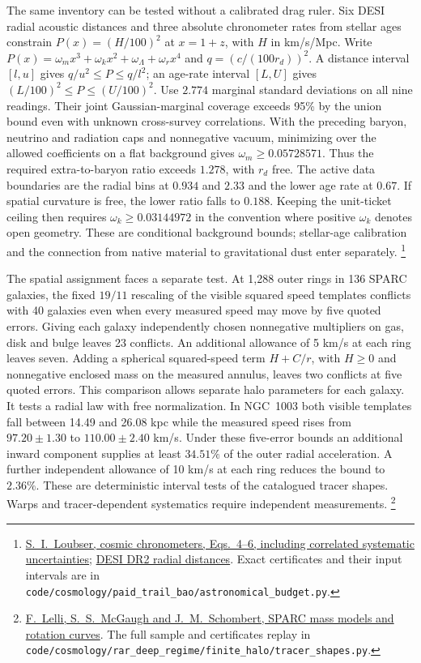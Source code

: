 \documentclass[11pt]{article}
\begin{document}
The same inventory can be tested without a calibrated drag ruler.
Six DESI radial acoustic distances and three absolute chronometer
rates from stellar ages constrain $P(x)=(H/100)^2$ at $x=1+z$,
with $H$ in km/s/Mpc. Write
$P(x)=\omega_m x^3+\omega_k x^2+\omega_\Lambda+\omega_r x^4$ and
$q=(c/(100r_d))^2$. A distance interval $[l,u]$ gives
$q/u^2\le P\le q/l^2$; an age-rate interval $[L,U]$ gives
$(L/100)^2\le P\le(U/100)^2$. Use $2.774$ marginal standard
deviations on all nine readings. Their joint Gaussian-marginal
coverage exceeds 95\% by the union bound even with unknown
cross-survey correlations. With the preceding baryon, neutrino and
radiation caps and nonnegative vacuum, minimizing over the allowed
coefficients on a flat background gives $\omega_m\ge0.05728571$.
Thus the required extra-to-baryon ratio exceeds $1.278$, with $r_d$
free. The active data boundaries are the radial bins at $0.934$ and
$2.33$ and the lower age rate at $0.67$. If spatial curvature is
free, the lower ratio falls to $0.188$. Keeping the unit-ticket
ceiling then requires $\omega_k\ge0.03144972$ in the convention
where positive $\omega_k$ denotes open geometry. These are
conditional background bounds; stellar-age calibration and the
connection from native material to gravitational dust enter separately.%
\footnote{\href{https://arxiv.org/abs/2511.02730}{S.~I.~Loubser, cosmic chronometers,
Eqs.~4--6, including correlated systematic uncertainties};
\href{https://arxiv.org/abs/2503.14738}{DESI DR2 radial distances}. Exact certificates and their input intervals are in \nolinkurl{code/cosmology/paid_trail_bao/astronomical_budget.py}.}

The spatial assignment faces a separate test. At 1,288 outer rings in
136 SPARC galaxies, the fixed $19/11$ rescaling of the visible squared
speed templates conflicts with 40 galaxies even when every measured speed
may move by five quoted errors. Giving each galaxy independently chosen
nonnegative multipliers on gas, disk and bulge leaves 23 conflicts.
An additional allowance of 5 km/s at each ring leaves seven. Adding a
spherical squared-speed term $H+C/r$, with $H\ge0$ and nonnegative
enclosed mass on the measured annulus, leaves two conflicts at five
quoted errors. This comparison allows separate halo parameters for
each galaxy. It tests a radial law with free normalization.
In NGC~1003 both visible templates fall between 14.49 and 26.08 kpc
while the measured speed rises from $97.20\pm1.30$ to
$110.00\pm2.40$ km/s. Under these five-error bounds an additional
inward component supplies at least $34.51\%$ of the outer radial
acceleration. A further independent allowance of 10 km/s at each
ring reduces the bound to $2.36\%$. These are deterministic interval
tests of the catalogued tracer shapes. Warps and tracer-dependent
systematics require independent measurements.%
\footnote{\href{https://doi.org/10.3847/0004-6256/152/6/157}{F.~Lelli,
S.~S.~McGaugh and J.~M.~Schombert, SPARC mass models and rotation curves}. The full sample and certificates replay in \nolinkurl{code/cosmology/rar_deep_regime/finite_halo/tracer_shapes.py}.}
\end{document}
